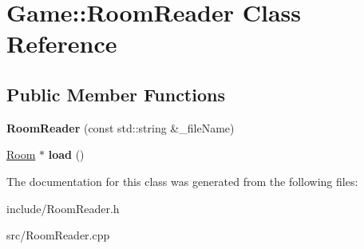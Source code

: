 \hypertarget{classGame_1_1RoomReader}{\section{Game\-:\-:Room\-Reader Class Reference}
\label{classGame_1_1RoomReader}
}
\subsection*{Public Member Functions}
\begin{DoxyCompactItemize}
\item 
\hypertarget{classGame_1_1RoomReader_a7613a8c3805e09a10f1279d778681a07}{{\bfseries Room\-Reader} (const std\-::string \&\-\_\-file\-Name)}\label{classGame_1_1RoomReader_a7613a8c3805e09a10f1279d778681a07}

\item 
\hypertarget{classGame_1_1RoomReader_ae25f5939e21dcfa81df9ef8207b19491}{\hyperlink{classGame_1_1Room}{Room} $\ast$ {\bfseries load} ()}\label{classGame_1_1RoomReader_ae25f5939e21dcfa81df9ef8207b19491}

\end{DoxyCompactItemize}


The documentation for this class was generated from the following files\-:\begin{DoxyCompactItemize}
\item 
include/Room\-Reader.\-h\item 
src/Room\-Reader.\-cpp\end{DoxyCompactItemize}

